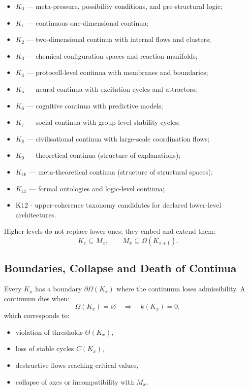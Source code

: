 \begin{itemize}
    \item $K_0$ — meta-pressure, possibility conditions, and pre-structural logic;
    \item $K_1$ — continuous one-dimensional continua;
    \item $K_2$ — two-dimensional continua with internal flows and clusters;
    \item $K_3$ — chemical configuration spaces and reaction manifolds;
    \item $K_4$ — protocell-level continua with membranes and boundaries;
    \item $K_5$ — neural continua with excitation cycles and attractors;
    \item $K_6$ — cognitive continua with predictive models;
    \item $K_7$ — social continua with group-level stability cycles;
    \item $K_8$ — civilisational continua with large-scale coordination flows;
    \item $K_9$ — theoretical continua (structure of explanations);
    \item $K_{10}$ — meta-theoretical continua (structure of structural spaces);
    \item $K_{11}$ — formal ontologies and logic-level continua;
    \item K12 - upper-coherence taxonomy candidates for declared lower-level architectures.
\end{itemize}

Higher levels do not replace lower ones; they embed and extend them:
\[
K_x \subseteq M_x, 
\qquad 
M_x \subseteq \Omega(K_{x+1}).
\]


\subsection{Boundaries, Collapse and Death of Continua}

Every $K_x$ has a boundary $\partial\Omega(K_x)$ where the
continuum loses admissibility.  
A continuum dies when:
\[
\Omega(K_x) = \varnothing
\quad\Rightarrow\quad
k(K_x) = 0,
\]
which corresponds to:
\begin{itemize}
    \item violation of thresholds $\Theta(K_x)$,
    \item loss of stable cycles $C(K_x)$,
    \item destructive flows reaching critical values,
    \item collapse of axes or incompatibility with $M_x$.
\end{itemize}

